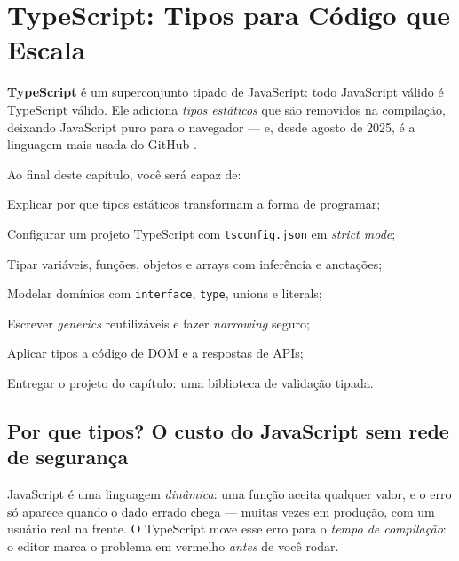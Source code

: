 \chapter{TypeScript: Tipos para Código que Escala}
\label{cap:typescript}

\begin{caixaconceito}
\textbf{TypeScript} é um superconjunto tipado de JavaScript: todo JavaScript
válido é TypeScript válido. Ele adiciona \emph{tipos estáticos} que são
removidos na compilação, deixando JavaScript puro para o navegador — e, desde
agosto de 2025, é a linguagem mais usada do GitHub \cite{octoverse2025}.
\end{caixaconceito}

Ao final deste capítulo, você será capaz de:
\begin{objetivos}
  \item Explicar por que tipos estáticos transformam a forma de programar;
  \item Configurar um projeto TypeScript com \texttt{tsconfig.json} em \emph{strict mode};
  \item Tipar variáveis, funções, objetos e arrays com inferência e anotações;
  \item Modelar domínios com \texttt{interface}, \texttt{type}, unions e literals;
  \item Escrever \emph{generics} reutilizáveis e fazer \emph{narrowing} seguro;
  \item Aplicar tipos a código de DOM e a respostas de APIs;
  \item Entregar o projeto do capítulo: uma biblioteca de validação tipada.
\end{objetivos}

\section{Por que tipos? O custo do JavaScript sem rede de segurança}

JavaScript é uma linguagem \emph{dinâmica}: uma função aceita qualquer valor,
e o erro só aparece quando o dado errado chega — muitas vezes em produção, com
um usuário real na frente. O TypeScript move esse erro para o \emph{tempo de
compilação}: o editor marca o problema em vermelho \emph{antes} de você rodar.

